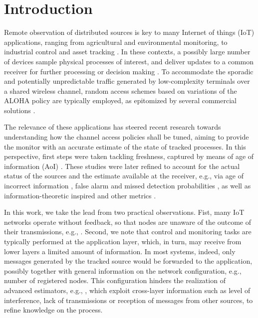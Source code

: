 \section{Introduction} \label{sec:intro}

Remote observation of distributed sources is key to many Internet of things (IoT) applications, ranging from agricultural and environmental monitoring, to industrial control and asset tracking \cite{Bedewy21_TIT,Yates20_Survey,Uysal21_Semantic}. In these contexts, a possibly large number of devices sample physical processes of interest, and deliver updates to a common receiver for further processing or decision making \cite{Pappas24_TCOM,Soleymani20_valueInfo}. To accommodate the sporadic and potentially unpredictable traffic generated by low-complexity terminals over a shared wireless channel, random access schemes based on variations of the ALOHA policy \cite{Abramson77:PacketBroadcasting} are typically employed, as epitomized by several commercial solutions \cite{LoRa,SigFox}.

The relevance of these applications has steered recent research towards understanding how the channel access policies shall be tuned, aiming to provide the monitor with an accurate estimate of the state of tracked processes. In this perspective, first steps were taken tackling freshness, captured by means of age of information (AoI) \cite{Yates17:AoI_SA,Modiano18_AoI,Munari21_TCOM_AoI,Uysal21_AlohaThresh,Bidokhti22_TIT,Badia22_NetwLetters,Badia24_TMC,Liew20_INFOCOM,Munari23_TCOM}. These studies were later refined to account for the actual status of the sources and the estimate available at the receiver, e.g., via age of incorrect information \cite{Ephremides19_AoII,Chiariotti23:ICC,Munari24_ICC,Chiariotti25_INFOCOM}, false alarm and missed detection probabilities \cite{Pappas24_MOBIHOC,Munari23_Asilomar}, as well as information-theoretic inspired \cite{Cocco23_JSAIT,Liew22_TIT,Pappas23_WiOpt} and other metrics \cite{Soleymani20_valueInfo,Pappas24_WiOpt,Yates20_Survey}.

In this work, we take the lead from two practical observations. Fist, many IoT networks operate without feedback, so that nodes are unaware of the outcome of their transmissions, e.g., \cite{LoRa}. Second, we note that control and monitoring tasks are typically performed at the application layer, which, in turn, may receive from lower layers a limited amount of information. In most systems, indeed, only messages generated by the tracked source would be forwarded to the application, possibly together with general information on the network configuration, e.g., number of registered nodes. This configuration hinders the realization of advanced estimators, e.g., \cite{Cocco23_JSAIT}, which exploit cross-layer information such as level of interference, lack of transmissions or reception of messages from other sources, to refine knowledge on the process. 

